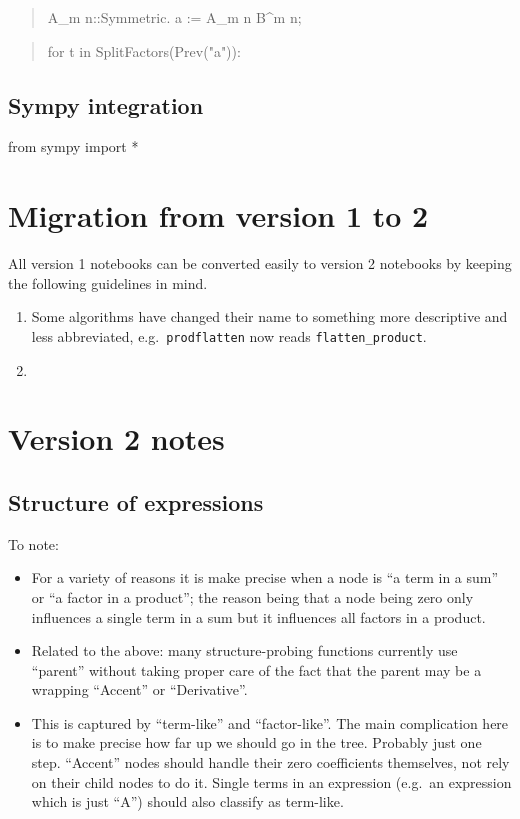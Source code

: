 \documentclass[11pt]{article}
\begin{document}
\begin{quote}
A_{m n}::Symmetric.
a := A_{m n} B^{m n};
\end{quote}
\begin{quote}
for t in SplitFactors(Prev("a")):
   
\end{quote}


\subsection{Sympy integration}

from sympy import *



\section{Migration from version 1 to 2}

All version 1 notebooks can be converted easily to version 2 notebooks by 
keeping the following guidelines in mind.
\begin{enumerate}
\item Some algorithms have changed their name to something more descriptive
and less abbreviated, e.g.~{\tt prodflatten} now reads {\tt flatten\_product}.
\item 
\end{enumerate}


\section{Version 2 notes}

\subsection{Structure of expressions}

To note:
\begin{itemize}
\item For a variety of reasons it is make precise when a node is ``a
  term in a sum'' or ``a factor in a product''; the reason being that
  a node being zero only influences a single term in a sum but it
  influences all factors in a product. 

\item Related to the above: many structure-probing functions currently
  use ``parent'' without taking proper care of the fact that the
  parent may be a wrapping ``Accent'' or ``Derivative''. 

\item This is captured by ``term-like'' and ``factor-like''. The main
  complication here is to make precise how far up we should go in the
  tree. Probably just one step. ``Accent'' nodes should handle their
  zero coefficients themselves, not rely on their child nodes to do
  it. Single terms in an expression (e.g.~an expression which is just
  ``A'') should also classify as term-like.
\end{itemize}
\end{document}
